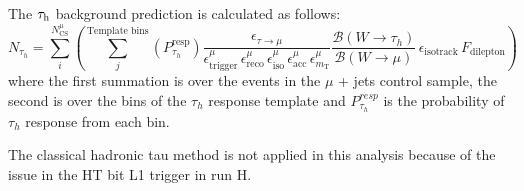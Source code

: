 The $\tau_\mathrm{h}$ background prediction is calculated as follows:
\begin{equation}
N_{\tau_{h}} = \sum\limits_i^{N_\mathrm{CS}^\mu}\left(\sum\limits_j^\text{Template bins}(P_{\tau_h}^\text{resp})
\frac{\epsilon_{\tau \rightarrow \mu}}{\epsilon^{\mu}_\text{trigger}\,\epsilon^{\mu}_\text{reco}\,\epsilon^{\mu}_\text{iso}\,\epsilon^{\mu}_\text{acc}\,\epsilon^{\mu}_{m_\text{T}}} \dfrac{ \mathcal{B}(W \rightarrow \tau_h)}{\mathcal{B}(W \rightarrow \mu)}\,\epsilon_\text{isotrack}\,F_\text{dilepton}\right)
\label{eq:tauh}
\end{equation}
where the first summation is over the events in the $\mu$ + jets control sample, the second is over the bins of the $\tau_h$ response template and $P_{\tau_h}^{resp}$ is the probability of $\tau_h$ response from each bin.

The classical hadronic tau method is not applied in this analysis because of the issue in the HT bit L1 trigger in run H.
